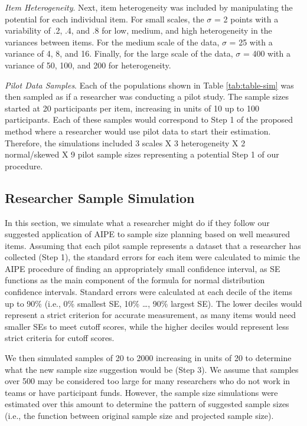 \documentclass[
  man]{apa7}
\begin{document}
\emph{Item Heterogeneity}. Next, item heterogeneity was included by manipulating the potential for each individual item. For small scales, the \(\sigma\) = 2 points with a variability of .2, .4, and .8 for low, medium, and high heterogeneity in the variances between items. For the medium scale of the data, \(\sigma\) = 25 with a variance of 4, 8, and 16. Finally, for the large scale of the data, \(\sigma\) = 400 with a variance of 50, 100, and 200 for heterogeneity.

\emph{Pilot Data Samples}. Each of the populations shown in Table \ref{tab:table-sim} was then sampled as if a researcher was conducting a pilot study. The sample sizes started at 20 participants per item, increasing in units of 10 up to 100 participants. Each of these samples would correspond to Step 1 of the proposed method where a researcher would use pilot data to start their estimation. Therefore, the simulations included 3 scales X 3 heterogeneity X 2 normal/skewed X 9 pilot sample sizes representing a potential Step 1 of our procedure.

\hypertarget{researcher-sample-simulation}{%
\subsection{Researcher Sample Simulation}\label{researcher-sample-simulation}}

In this section, we simulate what a researcher might do if they follow our suggested application of AIPE to sample size planning based on well measured items. Assuming that each pilot sample represents a dataset that a researcher has collected (Step 1), the standard errors for each item were calculated to mimic the AIPE procedure of finding an appropriately small confidence interval, as SE functions as the main component of the formula for normal distribution confidence intervals. Standard errors were calculated at each decile of the items up to 90\% (i.e., 0\% smallest SE, 10\% \ldots, 90\% largest SE). The lower deciles would represent a strict criterion for accurate measurement, as many items would need smaller SEs to meet cutoff scores, while the higher deciles would represent less strict criteria for cutoff scores.

We then simulated samples of 20 to 2000 increasing in units of 20 to determine what the new sample size suggestion would be (Step 3). We assume that samples over 500 may be considered too large for many researchers who do not work in teams or have participant funds. However, the sample size simulations were estimated over this amount to determine the pattern of suggested sample sizes (i.e., the function between original sample size and projected sample size).
\end{document}
